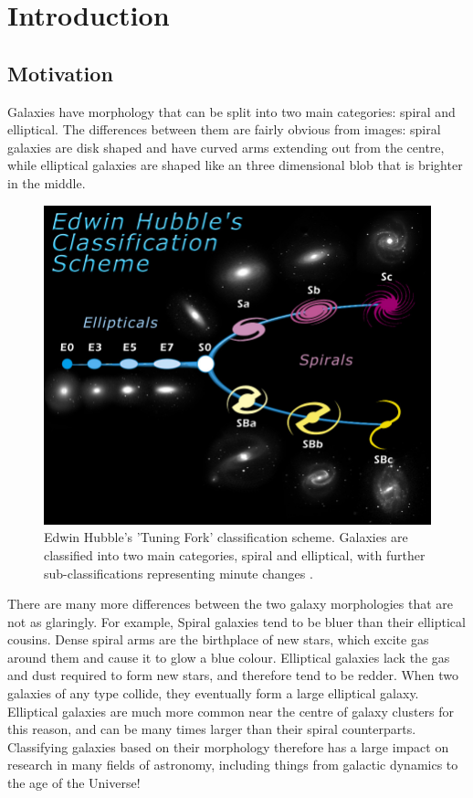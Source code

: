 \section{Introduction}
\label{sec:intro}
\subsection{Motivation}
Galaxies have morphology that can be split into two main categories: spiral and elliptical. 
The differences between them are fairly obvious from images: spiral galaxies are disk shaped and have curved arms extending out from the centre, while elliptical galaxies are shaped like an three dimensional blob that is brighter in the middle. 

\begin{figure}[h]
	\centering
	\captionsetup{justification=centering,width=.8\linewidth}
	\includegraphics[scale=0.7]{Figures/TuningFork.jpg}
	\caption{Edwin Hubble's 'Tuning Fork' classification scheme. Galaxies are classified into two main categories, spiral and elliptical, with further sub-classifications representing minute changes \cite{TuningFork}.}
	\label{fig:tuningfork}
\end{figure}


There are many more differences between the two galaxy morphologies that are not as glaringly.  
For example, Spiral galaxies tend to be bluer than their elliptical cousins. 
Dense spiral arms are the birthplace of new stars, which excite gas around them and cause it to glow a blue colour. 
Elliptical galaxies lack the gas and dust required to form new stars, and therefore tend to be redder. 
When two galaxies of any type collide, they eventually form a large elliptical galaxy. 
Elliptical galaxies are much more common near the centre of galaxy clusters for this reason, and can be many times larger than their spiral counterparts.
Classifying galaxies based on their morphology therefore has a large impact on research in many fields of astronomy, including things from galactic dynamics to the age of the Universe!

